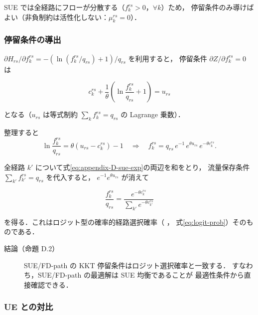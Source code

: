 SUE では全経路にフローが分散する（$f_k^{rs} > 0$，$\forall k$）ため，
停留条件のみ導けばよい（非負制約は活性化しない：$\mu_k^{rs} = 0$）．

\subsubsection*{停留条件の導出}

$\partial H_{rs} / \partial f_k^{rs} = -(\ln(f_k^{rs}/q_{rs}) + 1)/q_{rs}$ を利用すると，
停留条件 $\partial Z / \partial f_k^{rs} = 0$ は

\begin{equation}
  c_k^{rs}
  + \frac{1}{\theta}\left(\ln\frac{f_k^{rs}}{q_{rs}} + 1\right)
  = u_{rs}
  \label{eq:appendix-D-sue-stationarity}
\end{equation}

となる（$u_{rs}$ は等式制約 $\sum_k f_k^{rs} = q_{rs}$ の Lagrange 乗数）．

整理すると
\begin{equation}
  \ln\frac{f_k^{rs}}{q_{rs}}
  = \theta(u_{rs} - c_k^{rs}) - 1
  \quad \Longrightarrow \quad
  f_k^{rs} = q_{rs}\,e^{-1}\,e^{\theta u_{rs}}\,e^{-\theta c_k^{rs}}.
  \label{eq:appendix-D-sue-exp}
\end{equation}

全経路 $k'$ について式\eqref{eq:appendix-D-sue-exp}の両辺を和をとり，
流量保存条件 $\sum_{k'} f_{k'}^{rs} = q_{rs}$ を代入すると，
$e^{-1}e^{\theta u_{rs}}$ が消えて

\begin{equation}
  \boxed{
    \frac{f_k^{rs}}{q_{rs}}
    = \frac{e^{-\theta c_k^{rs}}}
           {\displaystyle\sum_{k'} e^{-\theta c_{k'}^{rs}}}
  }
  \label{eq:appendix-D-sue-logit}
\end{equation}

を得る．これはロジット型の確率的経路選択確率（ ，
式\eqref{eq:logit-prob}）そのものである．

\begin{description}
  \item[結論（命題 D.2）]
    SUE/FD-path の KKT 停留条件はロジット選択確率と一致する．
    すなわち，SUE/FD-path の最適解は SUE 均衡であることが
    最適性条件から直接確認できる．
\end{description}

\subsubsection*{UE との対比}

